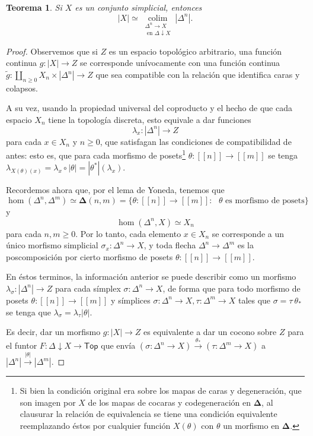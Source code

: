 \documentclass[11pt]{report}
\theoremstyle{colored}
\newtheorem{theorem}{Teorema}[section]
\newcommand{\nat}[1]{[\![#1]\!]}
\newcommand{\ord}[1]{\nat{#1}}
\renewcommand{\ss}[1]{\Delta^{#1}}
\newcommand{\ordcat}{\boldsymbol{\Delta}}
\newcommand{\catcolim}[2]{\underset{#1}{\operatorname{colim}}#2}
\begin{document}
\begin{theorem} Si $X$ es un conjunto simplicial, entonces
\[
|X| \simeq \catcolim{\substack{\ss{n} \to X \\ \text{ en $\Delta \downarrow X$}}}{|\ss{n}|}.
\]
\end{theorem}
\begin{proof} Observemos que si $Z$ es un espacio topológico arbitrario, una función continua $g : |X| \to Z$ se corresponde unívocamente con una función continua $\tilde{g} : \coprod_{n \geq 0} X_n \times |\ss{n}| \to Z$ que sea compatible con la relación que identifica caras y colapsos.

A su vez, usando la propiedad universal del coproducto y el hecho de que cada espacio $X_n$ tiene la topología discreta, esto equivale a dar funciones
\[
\lambda_x : |\ss{n}| \to Z
\]
para cada $x \in X_n$ y $n \geq 0$, que satisfagan las condiciones de compatibilidad de antes: esto es, que para cada morfismo de posets\footnote{Si bien la condición original era sobre los mapas de caras y degeneración, que son imagen por $X$ de los mapas de cocaras y codegeneración en $\ordcat$, al clausurar la relación de equivalencia se tiene una condición equivalente reemplazando éstos por cualquier función $X(\theta)$ con $\theta$ un morfismo en $\ordcat$.} $\theta : \ord{n} \to \ord{m}$ se tenga $\lambda_{X(\theta)(x)} = \lambda_x \circ |\theta| = |\theta^*|(\lambda_x)$.

Recordemos ahora que, por el lema de Yoneda, tenemos que
\[
\hom(\ss{n},\ss{m}) \simeq \ordcat(n,m) = \{\theta : \ord{n} \to \ord{m} : \text{ $\theta$ es morfismo de posets}\}
\]
y
\[
\hom(\ss{n}, X) \simeq X_n
\]
para cada $n,m \geq 0$. Por lo tanto, cada elemento $x \in X_n$ se corresponde a un único morfismo simplicial $\sigma_x : \ss{n} \to X$, y toda flecha $\ss{n} \to \ss{m}$ es la poscomposición por cierto morfismo de posets $\theta: \ord{n} \to \ord{m}$.

En éstos terminos, la información anterior se puede describir como un morfismo $\lambda_\sigma : |\ss{n}| \to Z$ para cada símplex $\sigma : \ss{n} \to X$, de forma que para todo morfismo de posets $\theta : \ord{n} \to \ord{m}$ y símplices $\sigma : \ss{n} \to X, \tau : \ss{m} \to X$ tales que $\sigma = \tau \  \theta_*$ se tenga que $\lambda_\sigma = \lambda_\tau |\theta|$. 

Es decir, dar un morfismo $g : |X| \to Z$ es equivalente a dar un cocono sobre $Z$ para el funtor $F : \Delta \downarrow X \to \mathsf{Top}$ que envía $(\sigma : \ss{n} \to X) \xrightarrow{\theta_*} (\tau : \ss{m} \to X)$ a $|\ss{n}| \xrightarrow{|\theta|} |\ss{m}|$.


\end{proof}
\end{document}
